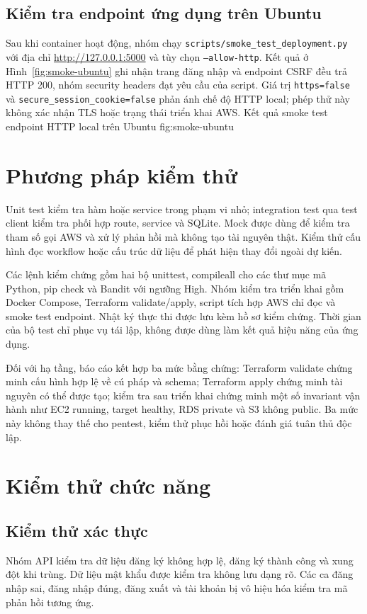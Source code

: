 \subsection{Kiểm tra endpoint ứng dụng trên Ubuntu}
Sau khi container hoạt động, nhóm chạy \texttt{scripts/smoke\_test\_deployment.py} với địa chỉ \url{http://127.0.0.1:5000} và tùy chọn \texttt{--allow-http}. Kết quả ở Hình~\ref{fig:smoke-ubuntu} ghi nhận trang đăng nhập và endpoint CSRF đều trả HTTP 200, nhóm security headers đạt yêu cầu của script. Giá trị \texttt{https=false} và \texttt{secure\_session\_cookie=false} phản ánh chế độ HTTP local; phép thử này không xác nhận TLS hoặc trạng thái triển khai AWS.
{Kết quả smoke test endpoint HTTP local trên Ubuntu}
{fig:smoke-ubuntu}

\section{Phương pháp kiểm thử}
Unit test kiểm tra hàm hoặc service trong phạm vi nhỏ; integration test qua test client kiểm tra phối hợp route, service và SQLite. Mock được dùng để kiểm tra tham số gọi AWS và xử lý phản hồi mà không tạo tài nguyên thật. Kiểm thử cấu hình đọc workflow hoặc cấu trúc dữ liệu để phát hiện thay đổi ngoài dự kiến.

Các lệnh kiểm chứng gồm hai bộ unittest, compileall cho các thư mục mã Python, pip check và Bandit với ngưỡng High. Nhóm kiểm tra triển khai gồm Docker Compose, Terraform validate/apply, script tích hợp AWS chỉ đọc và smoke test endpoint. Nhật ký thực thi được lưu kèm hồ sơ kiểm chứng. Thời gian của bộ test chỉ phục vụ tái lập, không được dùng làm kết quả hiệu năng của ứng dụng.

Đối với hạ tầng, báo cáo kết hợp ba mức bằng chứng: Terraform validate chứng minh cấu hình hợp lệ về cú pháp và schema; Terraform apply chứng minh tài nguyên có thể được tạo; kiểm tra sau triển khai chứng minh một số invariant vận hành như EC2 running, target healthy, RDS private và S3 không public. Ba mức này không thay thế cho pentest, kiểm thử phục hồi hoặc đánh giá tuân thủ độc lập.

\section{Kiểm thử chức năng}
\subsection{Kiểm thử xác thực}
Nhóm API kiểm tra dữ liệu đăng ký không hợp lệ, đăng ký thành công và xung đột khi trùng. Dữ liệu mật khẩu được kiểm tra không lưu dạng rõ. Các ca đăng nhập sai, đăng nhập đúng, đăng xuất và tài khoản bị vô hiệu hóa kiểm tra mã phản hồi tương ứng.

